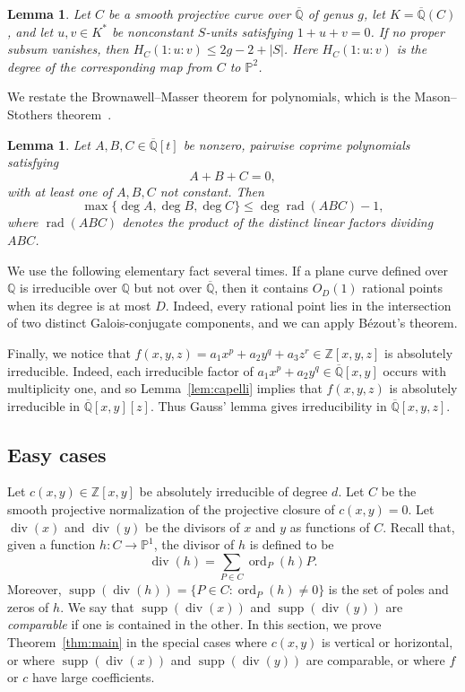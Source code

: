 \documentclass[a4paper,11pt,twoside,reqno]{amsart}
\newtheorem{lemma}[theorem]{Lemma}
\theoremstyle{definition}
\theoremstyle{remark}
\numberwithin{equation}{section}
\newcommand\Z{\mathbb{Z}}
\newcommand\supp{\operatorname{supp}}
\newcommand\ord{\operatorname{ord}}
\newcommand\Q{\mathbb{Q}}
\newcommand\K{\overline{\mathbb{Q}}}
\newcommand\1{\mathbf{1}}
\DeclareMathOperator\rad{rad}
\renewcommand{\leq}{\leqslant}
\begin{document}
\begin{lemma}\label{lem:Sunit}
 Let $C$ be a smooth projective curve over $\K$ of genus $g$, let $K=\K(C)$, and let $u,v\in K^*$ be nonconstant $S$-units satisfying $1+u+v=0$. If no proper subsum vanishes, then $H_C(1:u:v)\leq 2g-2+|S|$. Here $H_C(1:u:v)$ is the degree of the corresponding map from $C$ to $\mathbb{P}^2$.
\end{lemma}

We restate the Brownawell–Masser theorem for polynomials, which is the Mason--Stothers theorem~\cite[Theorem 1]{polabc}.

\begin{lemma}\label{lem:abc}
Let $A,B,C\in \overline{\Q}[t]$ be nonzero, pairwise coprime polynomials satisfying \[
A+B+C=0,
\]
with at least one of $A,B,C$ not constant. Then
\[\max\{\deg A,\deg B,\deg C\}\leq \deg\rad(ABC)-1,\]
where $\rad(ABC)$ denotes the product of the distinct linear factors dividing $ABC$.
\end{lemma}

We use the following elementary fact several times. If a plane curve defined over $\Q$ is irreducible over $\Q$ but not over $\K$, then it contains $O_D(1)$ rational points when its degree is at most $D$. Indeed, every rational point lies in the intersection of two distinct Galois-conjugate components, and we can apply Bézout's theorem.

Finally, we notice that $f(x,y,z)=a_1x^p+a_2y^q+a_3z^r\in \Z[x,y,z]$ is absolutely irreducible. Indeed, each irreducible factor of $a_1x^p+a_2y^q\in \overline{\Q}[x,y]$ occurs with multiplicity one, and so Lemma~\ref{lem:capelli} implies that $f(x,y,z)$ is absolutely irreducible in 
$\overline{\Q}[x,y][z]$. Thus Gauss' lemma gives 
irreducibility in $\overline{\Q}[x,y,z]$.

\subsection{Easy cases}
Let $c(x,y)\in \Z[x,y]$ be absolutely irreducible of degree $d$. Let $C$ be the smooth projective normalization of the projective closure of $c(x,y)=0$. Let $\operatorname{div}(x)$ and $\operatorname{div}(y)$ be the divisors of $x$ and $y$ as functions of $C$. Recall that, given a function $h:C\to \mathbb{P}^1$, the divisor of $h$ is defined to be 
\[
\operatorname{div}(h)=\sum_{P\in C}\ord_P(h)P.
\]
Moreover, 
$\supp(\operatorname{div}(h))=\{P\in C: \ord_P(h)\neq 0\}$ is the set of poles and zeros of $h$.
We say that $\supp(\operatorname{div}(x))$ and $\supp(\operatorname{div}(y))$ are {\em comparable} if one is contained in the other.
In this section, we prove Theorem~\ref{thm:main} in the special cases where $c(x,y)$ is vertical or horizontal, or where $\supp(\operatorname{div}(x))$ and $\supp(\operatorname{div}(y))$ are comparable, or where $f$ or $c$ have large coefficients.
\end{document}
